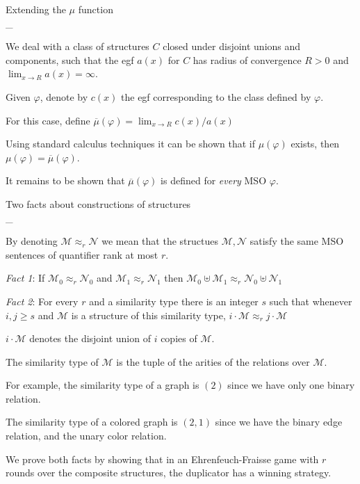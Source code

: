 \documentclass[landscape,a4]{myslides}
\begin{document}
\begin{slide}
\begin{center}
{%
\color{blue}
Extending the $\mu$ function
}
\\
\_\hrulefill
\end{center}
\small

We deal with a class of structures $C$ closed under disjoint unions and components, such that the egf $a(x)$ for $C$ has radius of convergence $R>0$ and $\lim_{x\to R}a(x)=\infty$.

Given $\varphi$, denote by $c(x)$ the egf corresponding to the class defined by $\varphi$.

For this case, define $\overline{\mu}(\varphi) = \lim_{x\to R} c(x)/a(x)$

Using standard calculus techniques it can be shown that if $\mu(\varphi)$ exists, then $\mu(\varphi)=\overline{\mu}(\varphi)$.

It remains to be shown that $\overline{\mu}(\varphi)$ is defined for \emph{every} MSO $\varphi$.
\end{slide}

\begin{slide}
\begin{center}
{%
\color{blue}
Two facts about constructions of structures
}
\\
\_\hrulefill
\end{center}
\small

By denoting $\mathcal{M}\approx_r\mathcal{N}$ we mean that the structues $\mathcal{M}, \mathcal{N}$ satisfy the same MSO sentences of quantifier rank at most $r$.

\emph{Fact 1}: If $\mathcal{M}_0\approx_r\mathcal{N}_0$ and $\mathcal{M}_1\approx_r\mathcal{N}_1$ then $\mathcal{M}_0\uplus\mathcal{M}_1\approx_r\mathcal{N}_0\uplus\mathcal{N}_1$

\emph{Fact 2}: For every $r$ and a similarity type there is an integer $s$ such that whenever $i,j\ge s$ and $\mathcal{M}$ is a structure of this similarity type, $i\cdot\mathcal{M}\approx_rj\cdot\mathcal{M}$

$i\cdot\mathcal{M}$ denotes the disjoint union of $i$ copies of $\mathcal{M}$.

The similarity type of $\mathcal{M}$ is the tuple of the arities of the relations over $\mathcal{M}$.

For example, the similarity type of a graph is $(2)$ since we have only one binary relation.

The similarity type of a colored graph is $(2,1)$ since we have the binary edge relation, and the unary color relation.

We prove both facts by showing that in an Ehrenfeuch-Fraisse game with $r$ rounds over the composite structures, the duplicator has a winning strategy.
\end{slide}
\end{document}

